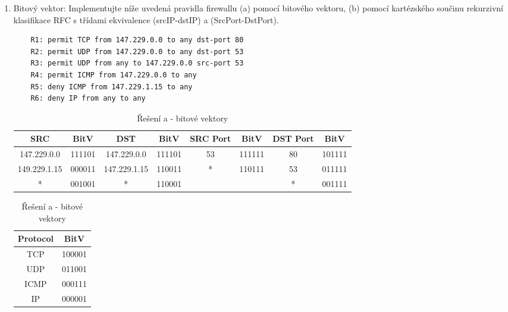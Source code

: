\documentclass[12pt,a4paper,titlepage,final]{article}
\begin{document}
\begin{enumerate}
	\item Bitový vektor: Implementujte níže uvedená pravidla firewallu (a) pomocí bitového vektoru, (b) pomocí kartézského součinu rekurzivní klasifikace RFC s třídami ekvivalence (srcIP-dstIP) a (SrcPort-DstPort).
	\begin{verbatim}
	R1: permit TCP from 147.229.0.0 to any dst-port 80
	R2: permit UDP from 147.229.0.0 to any dst-port 53
	R3: permit UDP from any to 147.229.0.0 src-port 53
	R4: permit ICMP from 147.229.0.0 to any
	R5: deny ICMP from 147.229.1.15 to any
	R6: deny IP from any to any
	\end{verbatim}
\begin{table}[h!]
	\centering	
	\begin{tabular}{| c | c || c | c || c | c || c | c |}
		\hline
		\textbf{SRC} & \textbf{BitV} & \textbf{DST} & \textbf{BitV} & \textbf{SRC Port} & \textbf{BitV} & \textbf{DST Port} & \textbf{BitV} \\ \hline \hline
		147.229.0.0 & 111101 & 147.229.0.0 & 111101 & 53 & 111111 & 80 & 101111 \\ \hline
		149.229.1.15 & 000011 & 147.229.1.15 & 110011 & * & 110111 & 53 & 011111 \\ \hline
		* & 001001 & * & 110001 & & & * & 001111 \\ \hline 	
	\end{tabular}
	
	\begin{tabular}{| c | c |}
		\hline
		\textbf{Protocol} & \textbf{BitV} \\ \hline \hline
		TCP & 100001 \\ \hline
		UDP & 011001 \\ \hline
		ICMP & 000111 \\ \hline
		IP & 000001 \\ \hline
	\end{tabular}
	\caption{Řešení a - bitové vektory}




\end{table}
\end{enumerate}
\end{document}
